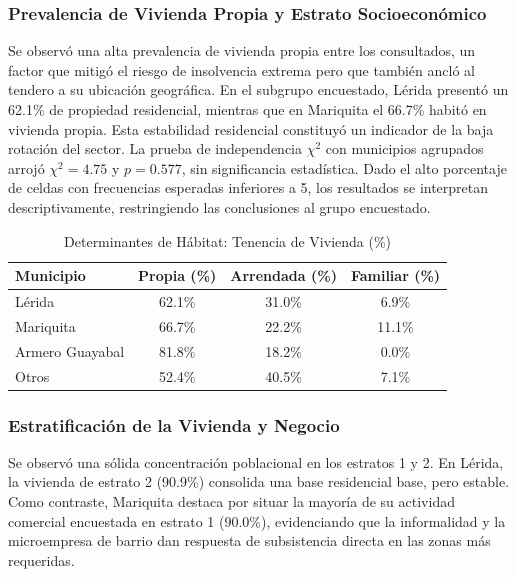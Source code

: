 \documentclass[11pt,a4paper]{article}
\begin{document}
\subsubsection{Prevalencia de Vivienda Propia y Estrato Socioecon\'omico}
Se observó una alta prevalencia de vivienda propia entre los consultados, un factor que mitigó el riesgo de insolvencia extrema pero que también ancló al tendero a su ubicación geográfica. En el subgrupo encuestado, Lérida presentó un 62.1\% de propiedad residencial, mientras que en Mariquita el 66.7\% habitó en vivienda propia. Esta estabilidad residencial constituyó un indicador de la baja rotación del sector. La prueba de independencia $\chi^{2}$ con municipios agrupados arrojó $\chi^{2} = 4.75$ y $p = 0.577$, sin significancia estadística. Dado el alto porcentaje de celdas con frecuencias esperadas inferiores a 5, los resultados se interpretan descriptivamente, restringiendo las conclusiones al grupo encuestado.

\begin{table}[H]
\centering
\caption{Determinantes de Hábitat: Tenencia de Vivienda (\%)}
\begin{tabular}{@{}lccc@{}}
\toprule
Municipio        & Propia (\%) & Arrendada (\%)  & Familiar (\%) \\ \midrule
Lérida             & 62.1\%        & 31.0\%        & 6.9\% \\
Mariquita          & 66.7\%        & 22.2\%        & 11.1\% \\
Armero Guayabal    & 81.8\%        & 18.2\%        & 0.0\% \\
Otros              & 52.4\%        & 40.5\%        & 7.1\% \\ \bottomrule
\end{tabular}
\end{table}

\subsubsection{Estratificaci\'on de la Vivienda y Negocio}
Se observó una sólida concentración poblacional en los estratos 1 y 2. En Lérida, la vivienda de estrato 2 (90.9\%) consolida una base residencial base, pero estable. Como contraste, Mariquita destaca por situar la mayoría de su actividad comercial encuestada en estrato 1 (90.0\%), evidenciando que la informalidad y la microempresa de barrio dan respuesta de subsistencia directa en las zonas más requeridas.
\end{document}

